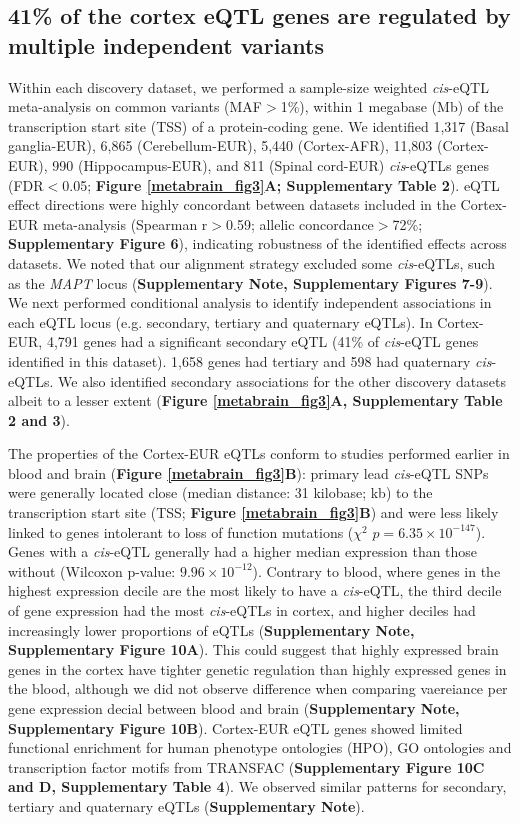 \subsection{41\% of the cortex eQTL genes are regulated by multiple independent variants}
Within each discovery dataset, we performed a sample-size weighted \textit{cis}-eQTL meta-analysis on common variants (MAF$>$1\%), within 1 megabase (Mb) of the transcription start site (TSS) of a protein-coding gene. We identified 1,317 (Basal ganglia-EUR), 6,865 (Cerebellum-EUR), 5,440 (Cortex-AFR), 11,803 (Cortex-EUR), 990 (Hippocampus-EUR), and 811 (Spinal cord-EUR) \textit{cis}-eQTLs genes (FDR$<$0.05; \textbf{Figure \ref{metabrain_fig3}A; Supplementary Table 2}). eQTL effect directions were highly concordant between datasets included in the Cortex-EUR meta-analysis (Spearman r$>$0.59; allelic concordance$>$72\%; \textbf{Supplementary Figure 6}), indicating robustness of the identified effects across datasets. We noted that our alignment strategy excluded some \textit{cis}-eQTLs, such as the \textit{MAPT} locus (\textbf{Supplementary Note, Supplementary Figures 7-9}). We next performed conditional analysis to identify independent associations in each eQTL locus (e.g. secondary, tertiary and quaternary eQTLs). In Cortex-EUR, 4,791 genes had a significant secondary eQTL (41\% of \textit{cis}-eQTL genes identified in this dataset). 1,658 genes had tertiary and 598 had quaternary \textit{cis}-eQTLs. We also identified secondary associations for the other discovery datasets albeit to a lesser extent (\textbf{Figure \ref{metabrain_fig3}A, Supplementary Table 2 and 3}).  

The properties of the Cortex-EUR eQTLs conform to studies performed earlier in blood\cite{vosaUnravelingPolygenicArchitecture2018} and brain\cite{dobbynLandscapeConditionalEQTL2018} (\textbf{Figure \ref{metabrain_fig3}B}): primary lead \textit{cis}-eQTL SNPs were generally located close (median distance: 31 kilobase; kb) to the transcription start site (TSS; \textbf{Figure \ref{metabrain_fig3}B}) and were less likely linked to genes intolerant to loss of function mutations ($\chi^2$ $p = 6.35 \times 10^{-147}$). Genes with a \textit{cis}-eQTL generally had a higher median expression than those without (Wilcoxon p-value: $9.96 \times 10^{-12}$). Contrary to blood, where genes in the highest expression decile are the most likely to have a \textit{cis}-eQTL, the third decile of gene expression had the most \textit{cis}-eQTLs in cortex, and higher deciles had increasingly lower proportions of eQTLs (\textbf{Supplementary Note, Supplementary Figure 10A}). This could suggest that highly expressed brain genes in the cortex have tighter genetic regulation than highly expressed genes in the blood, although we did not observe difference when comparing vaereiance per gene expression decial between blood and brain (\textbf{Supplementary Note, Supplementary Figure 10B}). Cortex-EUR eQTL genes showed limited functional enrichment for human phenotype ontologies (HPO), GO ontologies and transcription factor motifs from TRANSFAC\cite{wingenderTRANSFACDatabaseTranscription1996} (\textbf{Supplementary Figure 10C and D, Supplementary Table 4}). We observed similar patterns for secondary, tertiary and quaternary eQTLs (\textbf{Supplementary Note}). 

